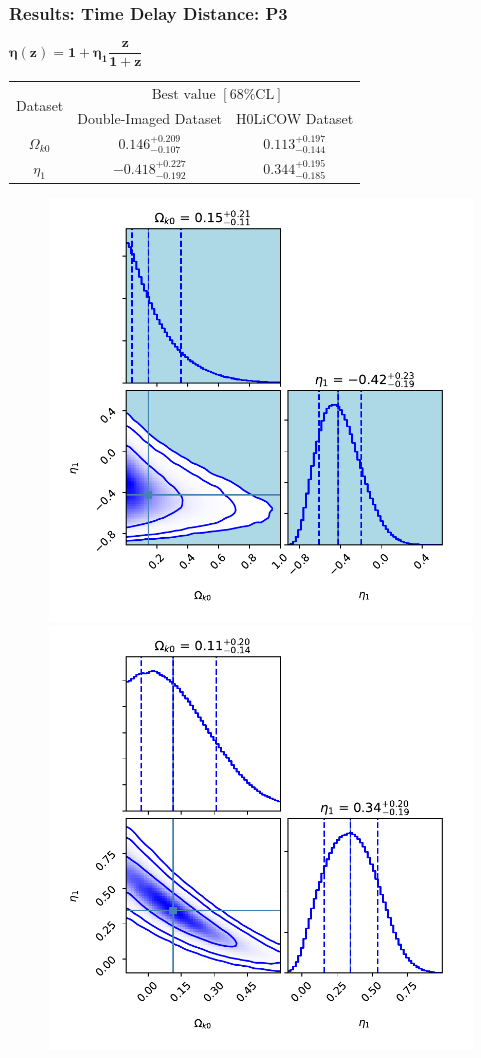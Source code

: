 \documentclass[xcolor=table,bigger]{beamer}
\begin{document}
\begin{frame}
 \frametitle{Results: Time Delay Distance: P3}
 $
{\boxed{\boldsymbol{\eta(z)=1+\eta_1\dfrac{z}{1+z}}}}
$

\begin{table}
  \begin{tabular}{|c|c|c|}
    \hline
    \multirow{2}{*}{Dataset} &
      \multicolumn{2}{c|}{${\text { Best value }[68 \% \mathrm{CL}]}$} \\
\cline{2-3}
    &Double-Imaged Dataset & H0LiCOW Dataset \\
    \hline
    $\Omega_{k0}$ & $ {0.146_{-0.107}^{+0.209}}$ & $0.113^{+0.197}_{-0.144}$ \\
    \hline
    $ \eta_1$ &${-0.418_{-0.192}^{+0.227}}$ &  $0.344^{+0.195}_{-0.185}$  \\
       \hline
  \end{tabular}
\end{table}


 \begin{figure}[ht!]
\centering
\includegraphics[width=43 mm]{time_delay_12_GRB_Pantheon_2nd_poly_P3_without_H0}
\includegraphics[width=43 mm]{H0LiCOW_P3}
\end{figure} 
\end{frame}
\end{document}
